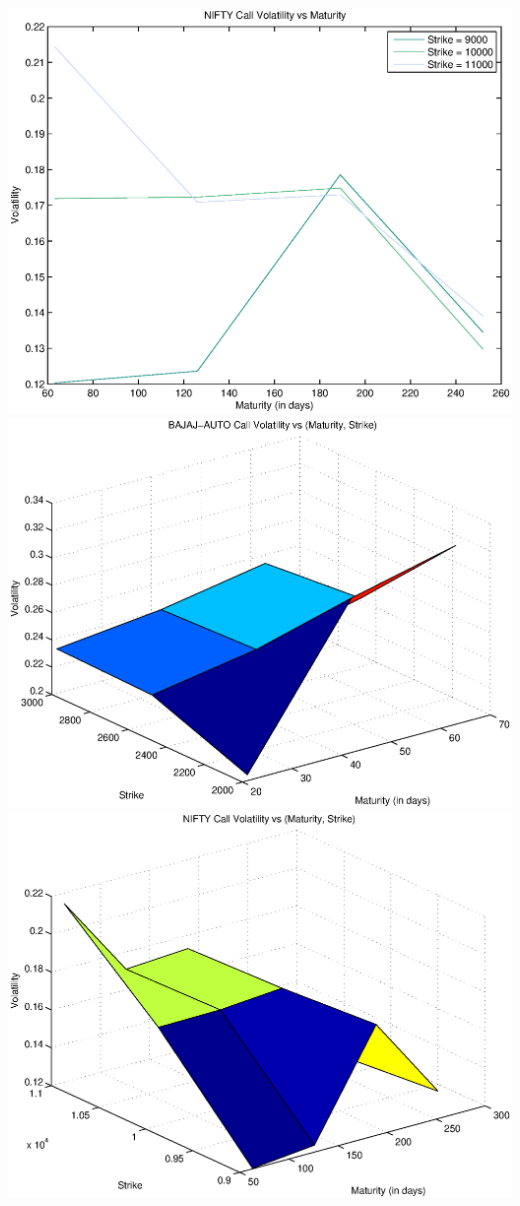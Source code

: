 \documentclass{article}
\begin{document}
\includegraphics[width=\textwidth]{NIFTY_Call_Volatility_vs_Maturity} \\
\includegraphics[width=\textwidth]{BAJAJ-AUTO_Call_Volatility_vs_(Maturity,_Strike)} \\    
\includegraphics[width=\textwidth]{NIFTY_Call_Volatility_vs_(Maturity,_Strike)} \\
\end{document}
